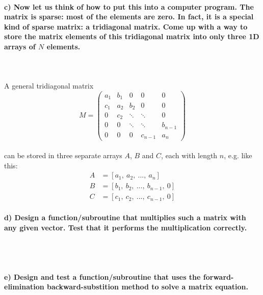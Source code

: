 \paragraph{
    c) Now let us think of how to put this into a computer program. The 
    matrix is sparse: most of the elements are zero. In fact, it is a 
    special kind of sparse matrix: a tridiagonal matrix. Come up with a 
    way to store the matrix elements of this tridiagonal matrix into 
    only three 1D arrays of $N$ elements.
} \ \\
    \\
    A general tridiagonal matrix 
    \begin{equation}
        M=
        \begin{pmatrix}
            a_1 & b_1 & 0      & 0       & 0 \\        
            c_1 & a_2 & b_2    & 0       & 0 \\        
            0   & c_2 & \ddots & \ddots  & 0 \\        
            0   & 0   & \ddots & \ddots  & b_{n-1} \\        
            0   & 0   & 0      & c_{n-1} & a_n
        \end{pmatrix}
    \end{equation} \ \\
    can be stored in three separate arrays $A$, $B$ and $C$, each with 
    length $n$, e.g. like this:
    \begin{align}
        A&=[a_1,\ a_2,\ ...,\ a_n] \\
        B&=[b_1,\ b_2,\ ...,\ b_{n-1},\ 0] \\
        C&=[c_1,\ c_2,\ ...,\ c_{n-1},\ 0]    
    \end{align}

\newpage
\paragraph{
    d) Design a function/subroutine that multiplies such a matrix with 
    any given vector. Test that it performs the multiplication correctly.
} \ \\
    \\
    

\paragraph{
    e) Design and test a function/subroutine that uses the 
    forward-elimination backward-substition method to solve a matrix 
    equation.
} \ \\
    \\

